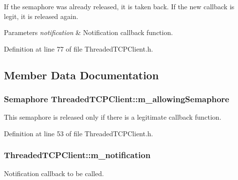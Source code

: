 If the semaphore was already released, it is taken back. If the new callback is legit, it is released again.


\begin{DoxyParams}{Parameters}
{\em notification} & Notification callback function. \\
\hline
\end{DoxyParams}


Definition at line 77 of file Threaded\-T\-C\-P\-Client.\-h.



\subsection{Member Data Documentation}
\hypertarget{class_threaded_t_c_p_client_a54007f130f17856b944f0f35656ebc5c}{
\subsubsection[{m\-\_\-allowing\-Semaphore}]{\setlength{\rightskip}{0pt plus 5cm}Semaphore Threaded\-T\-C\-P\-Client\-::m\-\_\-allowing\-Semaphore\hspace{0.3cm}{\ttfamily [private]}}}\label{class_threaded_t_c_p_client_a54007f130f17856b944f0f35656ebc5c}


This semaphore is released only if there is a legitimate callback function. 



Definition at line 53 of file Threaded\-T\-C\-P\-Client.\-h.

\hypertarget{class_threaded_t_c_p_client_adc7409a7ec74e4ee527be24008cc2208}{
\subsubsection[{m\-\_\-notification}]{ Threaded\-T\-C\-P\-Client\-::m\-\_\-notification\hspace{0.3cm}{\ttfamily [private]}}}\label{class_threaded_t_c_p_client_adc7409a7ec74e4ee527be24008cc2208}


Notification callback to be called. 



